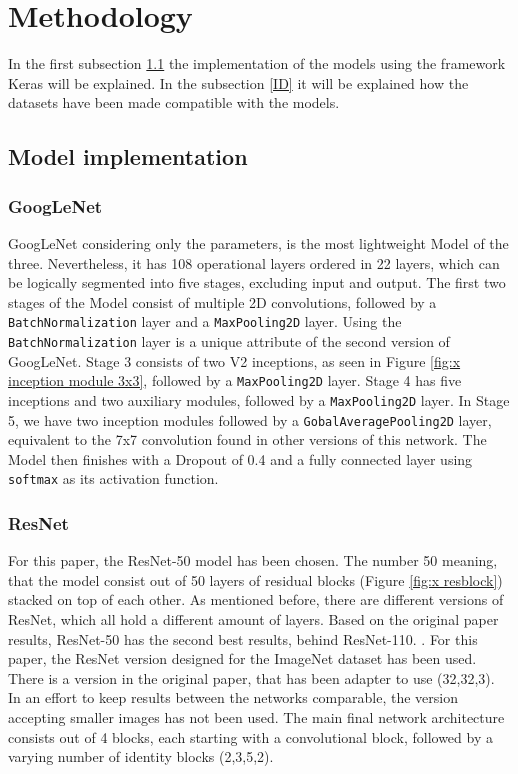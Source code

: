 \documentclass[conference]{IEEEtran}
\begin{document}
\section{Methodology}
In the first subsection \ref{IM} the implementation of the models using the framework Keras will be explained.
In the subsection \ref{ID} it will be explained how the datasets have been made compatible with the models.
\subsection{Model implementation}\label{IM}
\subsubsection{GoogLeNet}
GoogLeNet considering only the parameters, is the most lightweight Model of the three. Nevertheless, it has 108 operational layers ordered in 22 layers, which can be logically segmented into five stages, excluding input and output. 
The first two stages of the Model consist of multiple 2D convolutions, followed by a \verb|BatchNormalization| layer and a \verb|MaxPooling2D| layer. Using the \verb|BatchNormalization| layer is a unique attribute of the second version of GoogLeNet.
Stage 3 consists of two V2 inceptions, as seen in Figure \ref{fig:x inception module 3x3}, followed by a \verb|MaxPooling2D| layer.
Stage 4 has five inceptions and two auxiliary modules, followed by a \verb|MaxPooling2D| layer. 
In Stage 5, we have two inception modules followed by a \verb|GobalAveragePooling2D| layer, equivalent to the 7x7 convolution found in other versions of this network.
The Model then finishes with a Dropout of 0.4 and a fully connected layer using \verb|softmax| as its activation function.
\cite{szegedy_rethinking_2015}

\subsubsection{ResNet}
For this paper, the ResNet-50 model has been chosen. 
The number 50 meaning, that the model consist out of 50 layers of residual blocks (Figure \ref{fig:x resblock}) stacked on top of each other. 
As mentioned before, there are different versions of ResNet, which all hold a different amount of layers. 
Based on the original paper results, ResNet-50 has the second best results, behind ResNet-110. \cite{he_deep_2015}.  
For this paper, the ResNet version designed for the ImageNet dataset has been used. There is a version in the original paper, that has been adapter to use (32,32,3). 
In an effort to keep results between the networks comparable, the version accepting smaller images has not been used.
The main final network architecture consists out of 4 blocks, each starting with a convolutional block, followed by a varying number of identity blocks (2,3,5,2).
\end{document}
